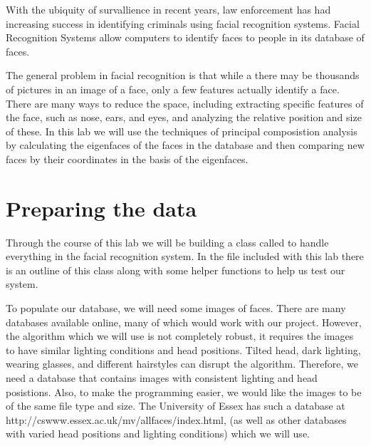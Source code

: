 \label{lab:FacialRecognition}


With the ubiquity of survallience in recent years, law enforcement has had increasing success in identifying criminals using facial recognition systems.
Facial Recognition Systems allow computers to identify faces to people in its database of faces.

The general problem in facial recognition is that while a there may be thousands of pictures in an image of a face, only a few features actually identify a face.
There are many ways to reduce the space, including extracting specific features of the face, such as nose, ears, and eyes, and analyzing the relative position and size of these.
In this lab we will use the techniques of principal composistion analysis by calculating the eigenfaces of the faces in the database and then comparing new faces by their coordinates in the basis of the eigenfaces.

\section*{Preparing the data}

Through the course of this lab we will be building a class called  to handle everything in the facial recognition system.
In the  file included with this lab there is an outline of this class along with some helper functions to help us test our system.

To populate our database, we will need some images of faces. 
There are many databases available online, many of which would work with our project.
However, the algorithm which we will use is not completely robust, it requires the images to have similar lighting conditions and head positions.
Tilted head, dark lighting, wearing glasses, and different hairstyles can disrupt the algorithm.
Therefore, we need a database that contains images with consistent lighting and head posistions.
Also, to make the programming easier, we would like the images to be of the same file type and size.
The University of Essex has such a database at http://cswww.essex.ac.uk/mv/allfaces/index.html, (as well as other databases with varied head positions and lighting conditions) which we will use.

